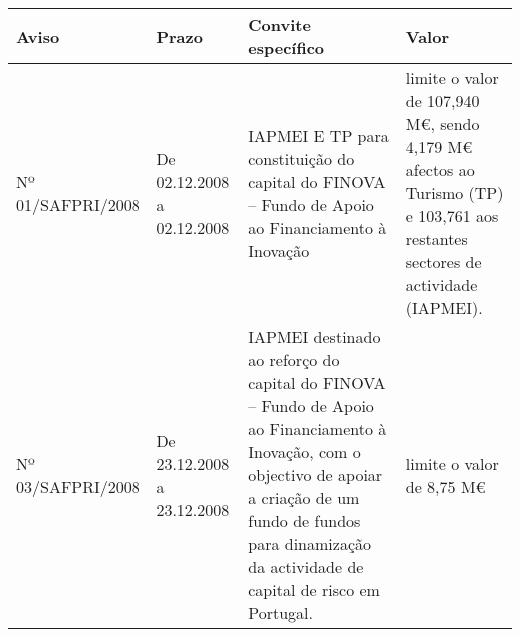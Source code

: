 \documentclass[]{book}
\newcommand{\euro}{€}
\theoremstyle{definition}
\theoremstyle{definition}
\theoremstyle{definition}
\theoremstyle{remark}
\begin{document}
\begin{longtable}[]{@{}llll@{}}
\toprule
\begin{minipage}[b]{0.17\columnwidth}\raggedright\strut
Aviso\strut
\end{minipage} & \begin{minipage}[b]{0.17\columnwidth}\raggedright\strut
Prazo\strut
\end{minipage} & \begin{minipage}[b]{0.17\columnwidth}\raggedright\strut
Convite específico\strut
\end{minipage} & \begin{minipage}[b]{0.17\columnwidth}\raggedright\strut
Valor\strut
\end{minipage}\tabularnewline
\midrule
\endhead
\begin{minipage}[t]{0.17\columnwidth}\raggedright\strut
Nº 01/SAFPRI/2008\strut
\end{minipage} & \begin{minipage}[t]{0.17\columnwidth}\raggedright\strut
De 02.12.2008 a 02.12.2008\strut
\end{minipage} & \begin{minipage}[t]{0.17\columnwidth}\raggedright\strut
IAPMEI E TP para constituição do capital do FINOVA -- Fundo de Apoio ao
Financiamento à Inovação\strut
\end{minipage} & \begin{minipage}[t]{0.17\columnwidth}\raggedright\strut
limite o valor de 107,940 M\euro{}, sendo 4,179 M\euro{} afectos ao
Turismo (TP) e 103,761 aos restantes sectores de actividade
(IAPMEI).\strut
\end{minipage}\tabularnewline
\begin{minipage}[t]{0.17\columnwidth}\raggedright\strut
Nº 03/SAFPRI/2008\strut
\end{minipage} & \begin{minipage}[t]{0.17\columnwidth}\raggedright\strut
De 23.12.2008 a 23.12.2008\strut
\end{minipage} & \begin{minipage}[t]{0.17\columnwidth}\raggedright\strut
IAPMEI destinado ao reforço do capital do FINOVA -- Fundo de Apoio ao
Financiamento à Inovação, com o objectivo de apoiar a criação de um
fundo de fundos para dinamização da actividade de capital de risco em
Portugal.\strut
\end{minipage} & \begin{minipage}[t]{0.17\columnwidth}\raggedright\strut
limite o valor de 8,75 M\euro{}\strut
\end{minipage}\tabularnewline

\end{longtable}
\end{document}
